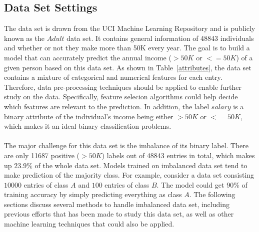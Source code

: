 \documentclass{article}
\begin{document}
\subsection{Data Set Settings}
The data set is drawn from the UCI Machine Learning Repository and is publicly known as the $Adult$ data set. It contains general information of 48843 individuals and whether or not they make more than 50K every year. The goal is to build a model that can accurately predict the annual income ($>50K$ or $<=50K$) of a given person based on this data set. As shown in Table~\ref{attributes}, the data set contains a mixture of categorical and numerical features for each entry. Therefore, data pre-processing techniques should be applied to enable further study on the data. Specifically, feature selecion algorithms could help decide which features are relevant to the prediction. In addition, the label $salary$ is a binary attribute of the individual's income being either $>50K$ or $<=50K$, which makes it an ideal binary classification problems.\\\\
The major challenge for this data set is the imbalance of its binary label. There are only 11687 positive ($>50K$) labels out of 48843 entries in total, which makes up $23.9\%$ of the whole data set. Models trained on imbalanced data set tend to make prediction of the majority class. For example, consider a data set consisting $10000$ entries of class $A$ and $100$ entries of class $B$. The model could get 90\% of training accuracy by simply predicting everything as class $A$. The following sections discuss several methods to handle imbalanced data set, including previous efforts that has been made to study this data set, as well as other machine learning techniques that could also be applied.
\end{document}
